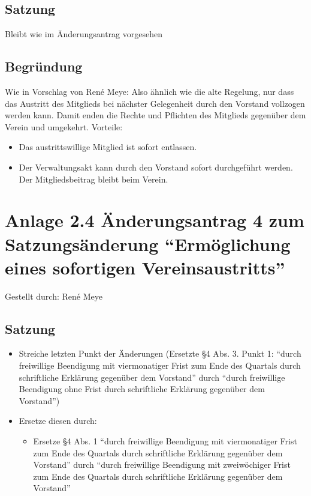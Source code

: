 \documentclass[a4paper,12pt,titlepage]{scrartcl}
\begin{document}
\subsection*{Satzung}
Bleibt wie im Änderungsantrag vorgesehen

\subsection*{Begründung}
Wie in Vorschlag von René Meye:
Also ähnlich wie die alte Regelung, nur dass das Austritt des Mitglieds bei nächster Gelegenheit durch den Vorstand vollzogen werden kann. Damit enden die Rechte und Pflichten des Mitglieds gegenüber dem Verein und umgekehrt. Vorteile:
\begin{itemize}
	\item Das austrittswillige Mitglied ist sofort entlassen.
	\item Der Verwaltungsakt kann durch den Vorstand sofort durchgeführt werden. Der Mitgliedsbeitrag bleibt beim Verein.
\end{itemize}

\newpage

\section*{Anlage 2.4 Änderungsantrag 4 zum Satzungsänderung “Ermöglichung eines sofortigen Vereinsaustritts”}

Gestellt durch: René Meye

\subsection*{Satzung}
\begin{itemize}
	\item Streiche letzten Punkt der Änderungen (Ersetzte §4 Abs. 3. Punkt 1: “durch freiwillige Beendigung mit viermonatiger Frist zum Ende des Quartals durch schriftliche Erklärung gegenüber dem Vorstand” durch “durch freiwillige Beendigung ohne Frist durch schriftliche Erklärung gegenüber dem Vorstand”)
	\item Ersetze diesen durch:
  	\begin{itemize}	
  		\item Ersetze §4 Abs. 1 “durch freiwillige Beendigung mit viermonatiger Frist zum Ende des Quartals durch schriftliche Erklärung gegenüber dem Vorstand” durch “durch freiwillige Beendigung mit zweiwöchiger Frist zum Ende des Quartals durch schriftliche Erklärung gegenüber dem Vorstand”
  	\end{itemize}
\end{itemize}  		
\end{document}
